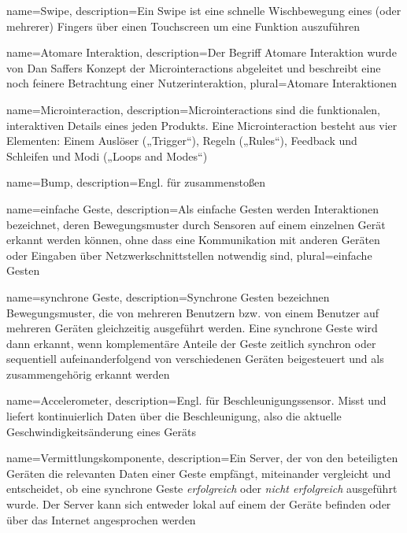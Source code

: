 {
    name=Swipe,
    description={Ein Swipe ist eine schnelle Wischbewegung eines (oder mehrerer) Fingers über einen Touchscreen um eine Funktion auszuführen}
}

{
    name=Atomare Interaktion,
    description={Der Begriff Atomare Interaktion wurde von Dan Saffers Konzept der Microinteractions abgeleitet und beschreibt eine noch feinere Betrachtung einer Nutzerinteraktion},
    plural={Atomare Interaktionen}
}

{
    name=Microinteraction,
    description={Microinteractions sind die funktionalen, interaktiven Details eines jeden Produkts. Eine Microinteraction besteht aus vier Elementen: Einem Auslöser („Trigger“), Regeln („Rules“), Feedback und Schleifen und Modi („Loops and Modes“)}
}

{
	name=Bump,
	description={Engl. für zusammenstoßen}
}

{
	name=einfache Geste,
	description={Als einfache Gesten werden Interaktionen bezeichnet, deren Bewegungsmuster durch Sensoren auf einem einzelnen Gerät erkannt werden können, ohne dass eine Kommunikation mit anderen Geräten oder Eingaben über Netzwerkschnittstellen notwendig sind},
	plural={einfache Gesten}
}

{
	name=synchrone Geste,
	description={Synchrone Gesten bezeichnen Bewegungsmuster, die von mehreren Benutzern bzw. von einem Benutzer auf mehreren Geräten gleichzeitig ausgeführt werden. Eine synchrone Geste wird dann erkannt, wenn komplementäre Anteile der Geste zeitlich synchron oder sequentiell aufeinanderfolgend von verschiedenen Geräten beigesteuert und als zusammengehörig erkannt werden \citep{Hinckley2003}}
}

{
	name=Accelerometer,
	description={Engl. für Beschleunigungssensor. Misst und liefert kontinuierlich Daten über die Beschleunigung, also die aktuelle Geschwindigkeitsänderung eines Geräts}
}

{
	name=Vermittlungskomponente,
	description={Ein Server, der von den beteiligten Geräten die relevanten Daten einer Geste empfängt, miteinander vergleicht und entscheidet, ob eine synchrone Geste \textit{erfolgreich} oder \textit{nicht erfolgreich} ausgeführt wurde. Der Server kann sich entweder lokal auf einem der Geräte befinden oder über das Internet angesprochen werden}
}


